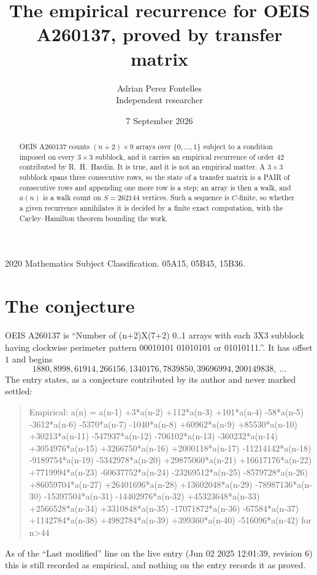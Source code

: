 \documentclass[11pt,a4paper]{article}
\title{The empirical recurrence for OEIS A260137, proved by transfer matrix}
\author{Adrian Perez Fontelles\\ \small Independent researcher}
\date{7 September 2026}
\theoremstyle{plain}
\theoremstyle{definition}
\begin{document}
\maketitle

\begin{abstract}
OEIS A260137 counts $(n+2)\times9$ arrays over $\{0,\dots,1\}$ subject to a condition imposed on
every $3\times3$ subblock, and it carries an empirical recurrence of order $42$
contributed by R.~H.~Hardin. It is true, and it is not an empirical matter. A $3\times3$
subblock spans three consecutive rows, so the state of a transfer matrix is a PAIR of
consecutive rows and appending one more row is a step; an array is then a walk, and
$a(n)$ is a walk count on $S=262144$ vertices. Such a sequence is $C$-finite, so whether a given
recurrence annihilates it is decided by a finite exact computation, with the Cayley--Hamilton
theorem bounding the work.
\end{abstract}

\noindent\small 2020 Mathematics Subject Classification. 05A15, 05B45, 15B36.\normalsize

\section{The conjecture}

OEIS A260137 is ``Number of (n+2)X(7+2) 0..1 arrays with each 3X3 subblock having clockwise perimeter pattern 00010101 01010101 or 01010111.''. It has offset $1$ and begins
\[
1880, 8998, 61914, 266156, 1340176, 7839850, 39696994, 200149838,\ \dots
\]
The entry states, as a conjecture contributed by its author and never marked settled:
\begin{quote}
Empirical: a(n) = a(n-1) +3*a(n-2) +112*a(n-3) +101*a(n-4) -58*a(n-5) -3612*a(n-6) -5370*a(n-7) -1040*a(n-8) +60962*a(n-9) +85530*a(n-10) +30213*a(n-11) -547937*a(n-12) -706102*a(n-13) -360232*a(n-14) +3054976*a(n-15) +3266750*a(n-16) +2000118*a(n-17) -11214142*a(n-18) -9189754*a(n-19) -5342978*a(n-20) +29875060*a(n-21) +16617176*a(n-22) +7719994*a(n-23) -60637752*a(n-24) -23269512*a(n-25) -8579728*a(n-26) +86059704*a(n-27) +26401696*a(n-28) +13602048*a(n-29) -78987136*a(n-30) -15397504*a(n-31) -14402976*a(n-32) +45323648*a(n-33) +2566528*a(n-34) +3310848*a(n-35) -17071872*a(n-36) -67584*a(n-37) +1142784*a(n-38) +4982784*a(n-39) +399360*a(n-40) -516096*a(n-42) for n>44
\end{quote}
As of the ``Last modified'' line on the live entry (Jun 02 2025 12:01:39, revision 6) this is still
recorded as empirical, and nothing on the entry records it as proved.
\end{document}
